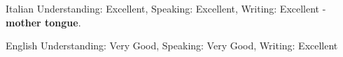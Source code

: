 


\begin{cvskills}

  \cvskill
    {Italian} %
	{Understanding: Excellent, Speaking: Excellent, Writing: Excellent
	- {\bfseries{mother tongue}}.} %

  \cvskill
    {English} %
    {Understanding: Very Good, Speaking: Very Good, Writing: Excellent} %

\end{cvskills}


